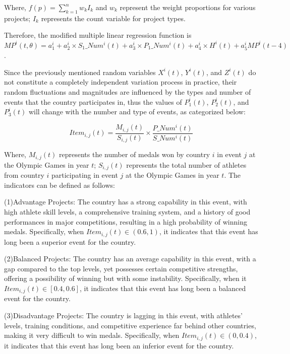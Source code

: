 \documentclass{mcmthesis}
\begin{document}
Where, $f(p) = \sum_{k=1}^{n}w_{k}I_{k}$ and $w_{k}$ represent the weight proportions for various projects; $I_{k}$ represents the count variable for project types.

Therefore, the modified multiple linear regression function is $MP^{i}(t, \theta) = a_{1}^{i}+a_{2}^{i}\times S_{1}\_Num^{i}(t) + a_{3}^{i}\times P_{1}\_Num^{i}(t) + a_{4}^{i}\times H^{i}(t) + a_{5}^{i}MP^{i}(t-4)$.

Since the previously mentioned random variables $X^{i}(t)$, $Y^{i}(t)$, and $Z^{i}(t)$ do not constitute a completely independent variation process in practice, their random fluctuations and magnitudes are influenced by the types and number of events that the country participates in, thus the values of $P_{1}^{i}(t)$, $P_{2}^{i}(t)$, and $P_{3}^{i}(t)$ will change with the number and type of events, as categorized below:

\begin{equation}
Item_{i, j}(t) = \frac{M_{i, j}(t)}{S_{i, j}(t)} \times \frac{P\_Num^{i}(t)}{S\_Num^{i}(t)}
\end{equation}

Where, $M_{i, j}(t)$ represents the number of medals won by country $i$ in event $j$ at the Olympic Games in year $t$; $S_{i, j}(t)$ represents the total number of athletes from country $i$ participating in event $j$ at the Olympic Games in year $t$. The indicators can be defined as follows:

(1)Advantage Projects: The country has a strong capability in this event, with high athlete skill levels, a comprehensive training system, and a history of good performances in major competitions, resulting in a high probability of winning medals. Specifically, when $Item_{i, j}(t)\in (0.6, 1)$, it indicates that this event has long been a superior event for the country.

(2)Balanced Projects: The country has an average capability in this event, with a gap compared to the top levels, yet possesses certain competitive strengths, offering a possibility of winning but with some instability. Specifically, when it $Item_{i, j}(t)\in [0.4, 0.6]$, it indicates that this event has long been a balanced event for the country.

(3)Disadvantage Projects: The country is lagging in this event, with athletes' levels, training conditions, and competitive experience far behind other countries, making it very difficult to win medals. Specifically, when $Item_{i, j}(t)\in (0, 0.4)$, it indicates that this event has long been an inferior event for the country.
\end{document}
